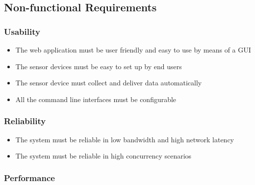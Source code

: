 \begin{usecase}
\end{usecase}

\begin{usecase}
\end{usecase}

\subsection{Non-functional Requirements}

\subsubsection*{Usability}

\begin{itemize}
	\item The web application must be user friendly and easy to use by means of a GUI
	\item The sensor devices must be easy to set up by end users
	\item The sensor device must collect and deliver data automatically
	\item All the command line interfaces must be configurable
\end{itemize}

\subsubsection*{Reliability}

\begin{itemize}
	\item The system must be reliable in low bandwidth and high network latency
	\item The system must be reliable in high concurrency scenarios
\end{itemize}

\subsubsection*{Performance}

